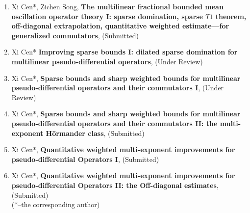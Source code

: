 \documentclass{article}
\begin{document}
\begin{enumerate}[label=~~\bf{\arabic*.}~, leftmargin=*]
\item Xi Cen*, Zichen Song,
\textbf{The multilinear fractional bounded mean oscillation operator theory I: sparse domination, sparse $T1$ theorem, off-diagonal extrapolation, quantitative weighted estimate---for generalized commutators},  (Submitted)\\
\item  Xi Cen*
\textbf{Improving sparse bounds I: dilated sparse domination for multilinear pseudo-differential operators}, (Under Review)\\
\item  Xi Cen*, 
\textbf{Sparse bounds and sharp weighted bounds for multilinear pseudo-differential operators and their commutators I}, (Under Review)\\
\item  Xi Cen*, 
\textbf{Sparse bounds and sharp weighted bounds for multilinear pseudo-differential operators and their commutators II: the multi-exponent H\"ormander class}, (Submitted)\\
\item  Xi Cen*,
\textbf{Quantitative weighted multi-exponent improvements for pseudo-differential Operators I}, (Submitted)\\
\item  Xi Cen*,
\textbf{Quantitative weighted multi-exponent improvements for pseudo-differential Operators II: the Off-diagonal estimates}, (Submitted)\\


(*--the corresponding author)



\end{enumerate}
\end{document}
